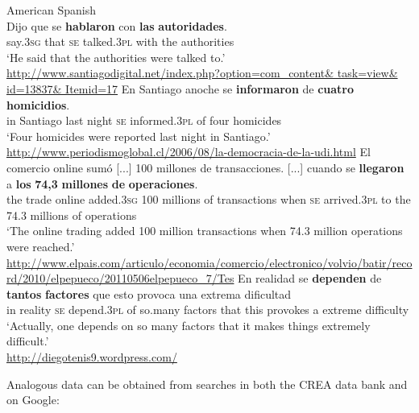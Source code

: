 \documentclass[output=paper]{langsci/langscibook}
\begin{document}
\ea%
    American Spanish\label{ex:gallego:27}\\
    \ea
    \gll Dijo que se  \textbf{hablaron}    con   \textbf{las}   \textbf{autoridades}.\\
         say.\textsc{3sg}  that \textsc{se}   talked.\textsc{3pl}  with  the  authorities\\
    \glt ‘He said that the authorities were talked to.’\\
    {\small\url{http://www.santiagodigital.net/index.php?option=com\_content\& task=view\& id=13837\& Itemid=17}}
    \ex
    \gll En Santiago anoche    se  \textbf{informaron}   de \textbf{cuatro}  \textbf{homicidios}.\\
         in  Santiago {last night} \textsc{se}   informed.\textsc{3pl} of  four     homicides\\
    \glt ‘Four homicides were reported last night in Santiago.’\\
    {\small\url{http://www.periodismoglobal.cl/2006/08/la-democracia-de-la-udi.html}}
    \ex
    \gll El  comercio online sumó [...]   100 millones de transacciones.          [...] cuando se   \textbf{llegaron}       a   \textbf{los} \textbf{74,3} \textbf{millones}  \textbf{de} \textbf{operaciones}.\\
         the trade       online added{}.\textsc{3sg} {} 100 millions  of transactions {}               when    \textsc{se}   arrived{}.\textsc{3pl}  to the 74.3 millions    of operations\\
    \glt ‘The online trading added 100 million transactions when 74.3 million operations were reached.’\\
    {\small\url{http://www.elpais.com/articulo/economia/comercio/electronico/volvio/batir/record/2010/elpepueco/20110506elpepueco\_7/Tes}}
    \ex
    \gll En realidad se  \textbf{dependen} de  \textbf{tantos} \textbf{factores}  que  esto provoca  una extrema  dificultad\\
         in   reality   \textsc{se}   depend{}.\textsc{3pl} of   so.many    factors  that this provokes a    extreme  difficulty\\
    \glt ‘Actually, one depends on so many factors that it makes things extremely difficult.’\\
         {\small\url{http://diegotenis9.wordpress.com/}}
    \z
\z    

Analogous data can be obtained from searches in both the CREA data bank and on Google:
\end{document}
